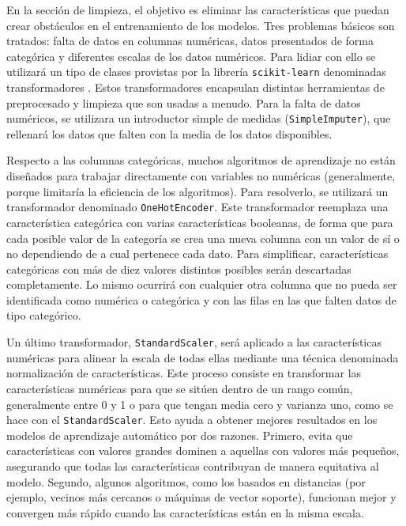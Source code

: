 En la sección de limpieza, el objetivo es eliminar las características que puedan crear obstáculos en el entrenamiento de los modelos. Tres problemas básicos son tratados: falta de datos en columnas numéricas, datos presentados de forma categórica y diferentes escalas de los datos numéricos. Para lidiar con ello se utilizará un tipo de clases provistas por la librería \texttt{scikit-learn} denominadas transformadores \cite{zheng2018feature}. Estos transformadores encapsulan distintas herramientas de preprocesado y limpieza que son usadas a menudo. Para la falta de datos numéricos, se utilizara un introductor simple de medidas (\texttt{SimpleImputer}), que rellenará los datos que falten con la media de los datos disponibles. 

Respecto a las columnas categóricas, muchos algoritmos de aprendizaje no están diseñados para trabajar directamente con variables no numéricas (generalmente, porque limitaría la eficiencia de los algoritmos). Para resolverlo, se utilizará un transformador denominado \texttt{OneHotEncoder}. Este transformador reemplaza una característica categórica con varias características booleanas, de forma que para cada posible valor de la categoría se crea una nueva columna con un valor de sí o no dependiendo de a cual pertenece cada dato. Para simplificar, características categóricas con más de diez valores distintos posibles serán descartadas completamente. Lo mismo ocurrirá con cualquier otra columna que no pueda ser identificada como numérica o categórica y con las filas en las que falten datos de tipo categórico.

Un último transformador, \texttt{StandardScaler}, será aplicado a las características numéricas para alinear la escala de todas ellas mediante una técnica denominada normalización de características. Este proceso consiste en transformar las características numéricas para que se sitúen dentro de un rango común, generalmente entre 0 y 1 o para que tengan media cero y varianza uno, como se hace con el \texttt{StandardScaler}. Esto ayuda a obtener mejores resultados en los modelos de aprendizaje automático por dos razones. Primero, evita que características con valores grandes dominen a aquellas con valores más pequeños, asegurando que todas las características contribuyan de manera equitativa al modelo. Segundo, algunos algoritmos, como los basados en distancias (por ejemplo, vecinos más cercanos o máquinas de vector soporte), funcionan mejor y convergen más rápido cuando las características están en la misma escala.


